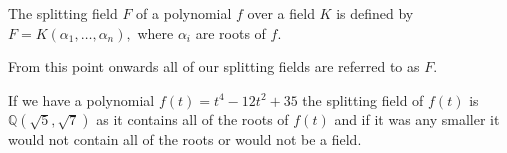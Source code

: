 \begin{definition}
    The splitting field $F$ of a polynomial $f$ over a field $K$ is defined by $F = K(\alpha_1, \ldots, \alpha_n), $ where $\alpha_i$ are roots of $f$. 
\end{definition}

From this point onwards all of our splitting fields are referred to as $F$.

\begin{example}
	If we have a polynomial \(f(t) = t^4 - 12t^2 + 35\) the splitting field of \(f(t)\) is \(\mathbb{Q}(\sqrt{5},\sqrt{7})\) as it contains all of the roots of \(f(t)\) and if it was any smaller it would not contain all of the roots or would not be a field.
\end{example}

